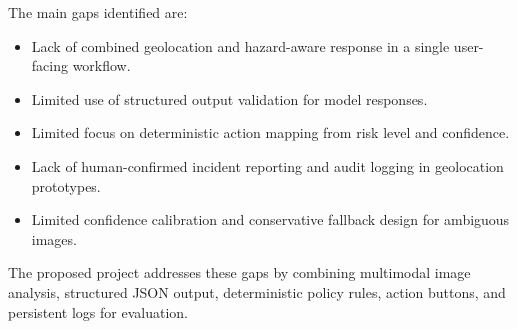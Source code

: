 The main gaps identified are:
\begin{itemize}
\item Lack of combined geolocation and hazard-aware response in a single user-facing workflow.
\item Limited use of structured output validation for model responses.
\item Limited focus on deterministic action mapping from risk level and confidence.
\item Lack of human-confirmed incident reporting and audit logging in geolocation prototypes.
\item Limited confidence calibration and conservative fallback design for ambiguous images.
\end{itemize}

The proposed project addresses these gaps by combining multimodal image analysis, structured JSON output, deterministic policy rules, action buttons, and persistent logs for evaluation.
